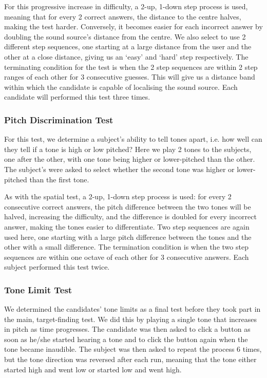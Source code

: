 \documentclass[format=sigconf, review=true, screen=true, anonymous=true]{acmart}
\begin{document}
For this progressive increase in difficulty, a 2-up, 1-down step process is used, meaning that for every 2 correct answers, the distance to the centre halves, making the test harder. Conversely, it becomes easier for each incorrect answer by doubling the sound source's distance from the centre. We also select to use 2 different step sequences, one starting at a large distance from the user and the other at a close distance, giving us an `easy' and `hard' step respectively. The terminating condition for the test is when the 2 step sequences are within 2 step ranges of each other for 3 consecutive guesses. This will give us a distance band within which the candidate is capable of localising the sound source. Each candidate will performed this test three times. 

\subsubsection{Pitch Discrimination Test}

For this test, we determine a subject's ability to tell tones apart, i.e. how well can they tell if a tone is high or low pitched? Here we play 2 tones to the subjects, one after the other, with one tone being higher or lower-pitched than the other. The subject's were asked to select whether the second tone was higher or lower-pitched than the first tone.

As with the spatial test, a 2-up, 1-down step process is used: for every 2 consecutive correct answers, the pitch difference between the two tones will be halved, increasing the difficulty, and the difference is doubled for every incorrect answer, making the tones easier to differentiate. Two step sequences are again used here, one starting with a large pitch difference between the tones and the other with a small difference. The termination condition is when the two step sequences are within one octave of each other for 3 consecutive answers. Each subject performed this test twice. 

\subsubsection{Tone Limit Test}

We determined the candidates' tone limits as a final test before they took part in the  main, target-finding test. We did this by playing a single tone that increases in pitch as time progresses. The candidate was then asked to click a button as soon as he/she started hearing a tone and to click the button again when the tone became inaudible. The subject was then asked to repeat the process 6 times, but the tone direction was reversed after each run, meaning that the tone either started high and went low or started low and went high. 
\end{document}
